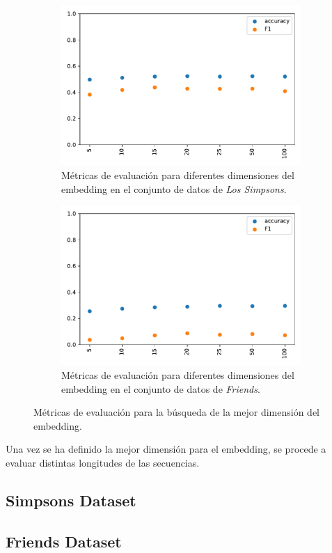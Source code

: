 \begin{figure}
    \centering
    \begin{subfigure}[b]{0.45\textwidth}
        \centering
        \includegraphics[width=\textwidth]{doc/images/seq_len/simpsons.pdf}
        \caption{Métricas de evaluación para diferentes dimensiones del embedding en el conjunto de datos de \textit{Los Simpsons}.}
        \label{fig:em_embedding_simpsons}
    \end{subfigure}
    \hfill
    \begin{subfigure}[b]{0.45\textwidth}
        \centering
        \includegraphics[width=\textwidth]{doc/images/seq_len/friends.pdf}
        \caption{Métricas de evaluación para diferentes dimensiones del embedding en el conjunto de datos de \textit{Friends}.}
        \label{fig:em_embedding_friends}
    \end{subfigure}
    \caption{Métricas de evaluación para la búsqueda de la mejor dimensión del embedding.}
    \label{fig:em_embedding}
\end{figure}

Una vez se ha definido la mejor dimensión para el embedding, se procede a evaluar distintas longitudes de las secuencias. 


\subsection{Simpsons Dataset}

\subsection{Friends Dataset}


